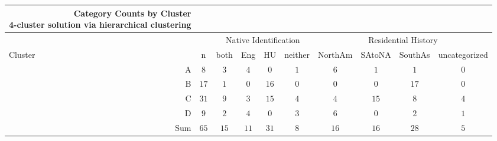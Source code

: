 \captionsetup[table]{labelformat=empty,skip=1pt}
\begin{longtable}{r|ccccccccc}
\caption*{
{\large Category Counts by Cluster} \\ 
{\small 4-cluster solution via hierarchical clustering}
} \\ 
\toprule
\multicolumn{1}{l}{} &  & \multicolumn{4}{c}{Native Identification} & \multicolumn{4}{c}{Residential History} \\ 
\cmidrule(lr){3-6} \cmidrule(lr){7-10}
\multicolumn{1}{l}{Cluster} & n & both & Eng & HU & neither & NorthAm & SAtoNA & SouthAs & uncategorized \\ 
\midrule
A & $8$ & $3$ & $4$ & $0$ & $1$ & $6$ & $1$ & $1$ & $0$ \\ 
B & $17$ & $1$ & $0$ & $16$ & $0$ & $0$ & $0$ & $17$ & $0$ \\ 
C & $31$ & $9$ & $3$ & $15$ & $4$ & $4$ & $15$ & $8$ & $4$ \\ 
D & $9$ & $2$ & $4$ & $0$ & $3$ & $6$ & $0$ & $2$ & $1$ \\ 
\midrule 
\midrule 
Sum & $65$ & $15$ & $11$ & $31$ & $8$ & $16$ & $16$ & $28$ & $5$ \\ 
\bottomrule
\end{longtable}

